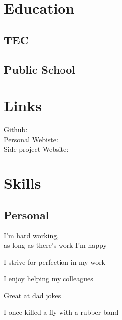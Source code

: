 \documentclass[]{cv}
\begin{document}

\begin{minipage}[t]{0.33\textwidth} 

\section{Education} 

\subsection{TEC}
\sectionsep

\subsection{Public School}
\sectionsep

\section{Links} 
Github: \href{https://github.com/rwejlgaard}{} \\
Personal Webiste: \href{https://pez.sh}{} \\
Side-project Website:  \href{https://pez.solutions}{} \\
\sectionsep

\section{Skills}
\subsection{Personal}

\vspace{\topsep}
\begin{tightemize}
	\item I'm hard working,\\ as long as there's work I'm happy
	\item I strive for perfection in my work
	\item I enjoy helping my colleagues
\end{tightemize}
\begin{tightemize}
	\item Great at dad jokes
	\item I once killed a fly with a rubber band
\end{tightemize}
\sectionsep


\end{minipage}
\end{document}
